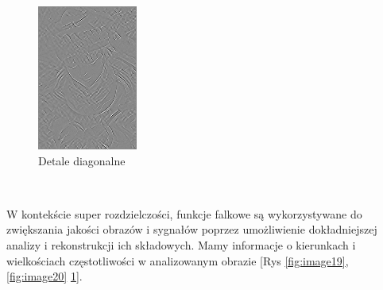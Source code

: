\begin{figure}[ht]
\begin{minipage}[t]{0.3\linewidth}
        \includegraphics[width=\linewidth]{Rozdziały/02.Podstawy_teoretyczne/Obrazy/diagonal_detail.png}
        \caption{Detale diagonalne}
        \label{fig:image21}
    \end{minipage}
\end{figure}\

W kontekście super rozdzielczości, funkcje falkowe są wykorzystywane do zwiększania jakości obrazów i sygnałów poprzez umożliwienie dokładniejszej analizy i rekonstrukcji ich składowych. Mamy informacje o kierunkach i wielkościach częstotliwości w analizowanym obrazie [Rys \ref{fig:image19}, \ref{fig:image20} \ref{fig:image21}]. 


